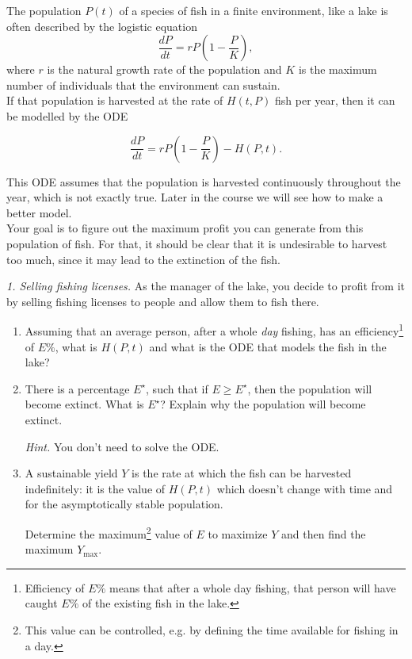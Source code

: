 The population $P(t)$ of a species of fish in a finite environment, like a lake is often described by the logistic equation
$$
\frac{dP}{dt} = r P \left(1 - \frac{P}{K} \right),
$$
where $r$ is the natural growth rate of the population and $K$ is the maximum number of individuals that the environment can sustain. \\

If that population is harvested at the rate of $H(t,P)$ fish per year, then it can be modelled by the ODE
\begin{emphbox}[]
$$
\frac{dP}{dt} = r P \left(1 - \frac{P}{K} \right) - H(P,t).
$$
\end{emphbox}


This ODE assumes that the population is harvested continuously throughout the year, which is not exactly true. Later in the course we will see how to make a better model. \\


Your goal is to figure out the maximum profit you can generate from this population of fish. For that, it should be clear that it is undesirable to harvest too much, since it may lead to the extinction of the fish.


\emph{1. Selling fishing licenses.}
As the manager of the lake, you decide to profit from it by selling fishing licenses to people and allow them to fish there. 

\begin{enumerate}[label=\emph{(\alph*)}]
\item Assuming that an average person, after a whole \emph{day} fishing, has an efficiency\footnote{Efficiency of $E\%$ means that after a whole day fishing, that person will have caught $E\%$ of the existing fish in the lake.} of $E\%$, what is $H(P,t)$ and what is the ODE that models the fish in the lake?

\item There is a percentage $E^\star$, such that if $E \geq E^\star$, then the population will become extinct. What is $E^\star$? Explain why the population will become extinct.

\emph{Hint.} You don't need to solve the ODE.



\item A sustainable yield $Y$ is the rate at which the fish can be harvested indefinitely: it is the value of $H(P,t)$ which doesn't change with time and for the asymptotically stable population.

Determine the maximum\footnote{This value can be controlled, e.g. by defining the time available for fishing in a day.} value of $E$ to maximize $Y$ and then find the maximum $Y_{\max}$.



\end{enumerate}







